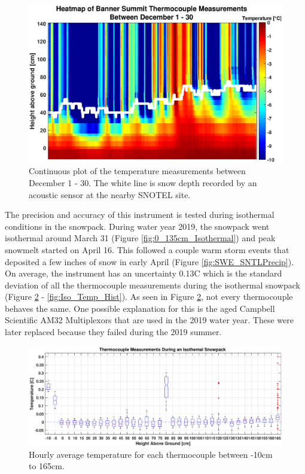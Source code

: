 \begin{figure}[H]
    \centering
    \includegraphics[width=0.9\linewidth]{figures/TCArray/Dec1_30Heatmap.eps}
    \caption{Continuous plot of the temperature measurements between December 1 - 30. The white line is  snow depth recorded by an acoustic sensor at the nearby SNOTEL site. }
    \label{fig:Dec_Jan_ImageSC}
 \end{figure}

The precision and accuracy of this instrument is tested during isothermal conditions in the snowpack. During water year 2019, the snowpack went isothermal around March 31 (Figure \ref{fig:0_135cm_Isothermal}) and peak snowmelt started on April 16. This followed a couple warm storm events that deposited a few inches of snow in early April (Figure \ref{fig:SWE_SNTLPrecip}). On average, the instrument has an uncertainty 0.13\textdegree C which is the standard deviation of all the thermocouple measurements during the isothermal snowpack (Figure \ref{fig:IsothermBoxplot} - \ref{fig:Iso_Temp_Hist}). As seen in Figure \ref{fig:IsothermBoxplot}, not every thermocouple behaves the same. One possible explanation for this is the aged Campbell Scientific AM32 Multiplexors that are used in the 2019 water year. These were later replaced because they failed during the 2019 summer.  

\begin{figure}
    \includegraphics[width=1\linewidth]{figures/TCArray/Isothermal_Boxplot.eps}
    \caption{Hourly average temperature for each thermocouple between -10cm to 165cm.}
    \label{fig:IsothermBoxplot}
 \end{figure}

